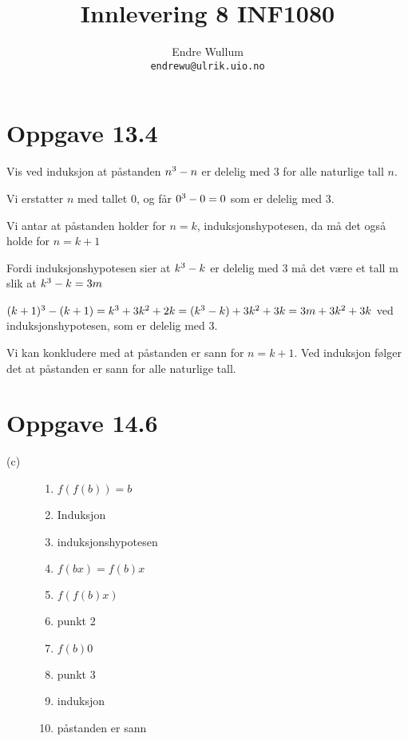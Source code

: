 \documentclass[12pt,norsk,a4paper]{article}
\title{Innlevering 8 INF1080}
\author{Endre Wullum\\ \texttt{endrewu@ulrik.uio.no}}
\begin{document}
\maketitle

\section*{Oppgave 13.4}
Vis ved induksjon at påstanden $n\textsuperscript{3} - n$ er delelig med 3 for alle naturlige tall $n$.

Vi erstatter $n$ med tallet 0, og får $0\textsuperscript{3} - 0 = 0$ som er delelig med 3.

Vi antar at påstanden holder for $n = k$, induksjonshypotesen, da må det også holde for $n = k + 1$

Fordi induksjonshypotesen sier at $k\textsuperscript{3} - k$ er delelig med 3 må det være et tall m slik at $k\textsuperscript{3} - k = 3m$

$(k+1)\textsuperscript{3} - (k+1) = k\textsuperscript{3} + 3k\textsuperscript{2} + 2k = (k\textsuperscript{3} - k) + 3k\textsuperscript{2} + 3k = 3m + 3k\textsuperscript{2} + 3k$ ved induksjonshypotesen, som er delelig med 3.

Vi kan konkludere med at påstanden er sann for $n=k+1$. Ved induksjon følger det at påstanden er sann for alle naturlige tall.

\section*{Oppgave 14.6}
\begin{description}
\item[(c)]
\begin{enumerate}
\item $f(f(b)) = b$
\item Induksjon
\item induksjonshypotesen
\item $f(bx) = f(b)x$
\item $f(f(b)x)$
\item punkt 2
\item $f(b)0$
\item punkt 3
\item induksjon
\item påstanden er sann
\end{enumerate}
\end{description}


\end{document}
